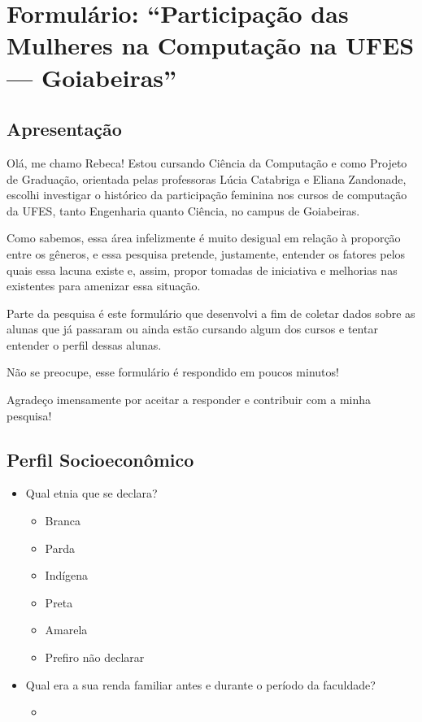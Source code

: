 \chapter{Formulário: “Participação das Mulheres na Computação na UFES — Goiabeiras”}

\section{Apresentação}

Olá, me chamo Rebeca! Estou cursando Ciência da Computação e como Projeto de Graduação, orientada pelas professoras Lúcia Catabriga e Eliana Zandonade, escolhi investigar o histórico da participação feminina nos cursos de computação da UFES, tanto Engenharia quanto Ciência, no campus de Goiabeiras. 

Como sabemos, essa área infelizmente é muito desigual em relação à proporção entre os gêneros, e essa pesquisa pretende, justamente, entender os fatores pelos quais essa lacuna existe e, assim, propor tomadas de iniciativa e melhorias nas existentes para amenizar essa situação.

Parte da pesquisa é este formulário que desenvolvi a fim de coletar dados sobre as alunas que já passaram ou ainda estão cursando algum dos cursos e tentar entender o perfil dessas alunas.

Não se preocupe, esse formulário é respondido em poucos minutos!

Agradeço imensamente por aceitar a responder e contribuir com a minha pesquisa!

\section{Perfil Socioeconômico}
\begin{itemize}
    \item Qual etnia que se declara?
    \begin{itemize}
        \item Branca
        \item Parda
        \item Indígena
        \item Preta
        \item Amarela
        \item Prefiro não declarar
    \end{itemize}
    \item Qual era a sua renda familiar antes e durante o período da faculdade?
    \begin{itemize}
        \item  
    \end{itemize}
\end{itemize}
\section{}